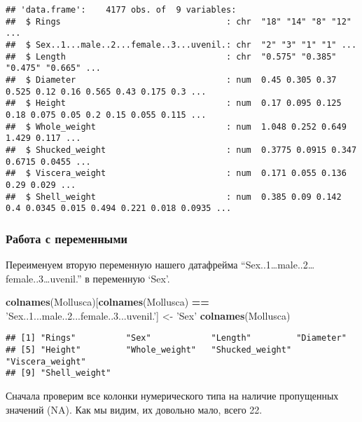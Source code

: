 \documentclass[]{article}
\newenvironment{Shaded}{\begin{snugshade}}{\end{snugshade}}
\newcommand{\KeywordTok}[1]{\textcolor[rgb]{0.13,0.29,0.53}{\textbf{#1}}}
\newcommand{\NormalTok}[1]{#1}
\newcommand{\OperatorTok}[1]{\textcolor[rgb]{0.81,0.36,0.00}{\textbf{#1}}}
\newcommand{\StringTok}[1]{\textcolor[rgb]{0.31,0.60,0.02}{#1}}
\begin{document}
\begin{verbatim}
## 'data.frame':    4177 obs. of  9 variables:
##  $ Rings                                 : chr  "18" "14" "8" "12" ...
##  $ Sex..1...male..2...female..3...uvenil.: chr  "2" "3" "1" "1" ...
##  $ Length                                : chr  "0.575" "0.385" "0.475" "0.665" ...
##  $ Diameter                              : num  0.45 0.305 0.37 0.525 0.12 0.16 0.565 0.43 0.175 0.3 ...
##  $ Height                                : num  0.17 0.095 0.125 0.18 0.075 0.05 0.2 0.15 0.055 0.115 ...
##  $ Whole_weight                          : num  1.048 0.252 0.649 1.429 0.117 ...
##  $ Shucked_weight                        : num  0.3775 0.0915 0.347 0.6715 0.0455 ...
##  $ Viscera_weight                        : num  0.171 0.055 0.136 0.29 0.029 ...
##  $ Shell_weight                          : num  0.385 0.09 0.142 0.4 0.0345 0.015 0.494 0.221 0.018 0.0935 ...
\end{verbatim}

\hypertarget{ux440ux430ux431ux43eux442ux430-ux441-ux43fux435ux440ux435ux43cux435ux43dux43dux44bux43cux438}{%
\subsubsection{Работа с
переменными}\label{ux440ux430ux431ux43eux442ux430-ux441-ux43fux435ux440ux435ux43cux435ux43dux43dux44bux43cux438}}

Переименуем вторую переменную нашего датафрейма
``Sex..1\ldots{}male..2\ldots{}female..3\ldots{}uvenil.'' в переменную
`Sex'.

\begin{Shaded}
\begin{Highlighting}[]
\KeywordTok{colnames}\NormalTok{(Mollusca)[}\KeywordTok{colnames}\NormalTok{(Mollusca) }\OperatorTok{==}\StringTok{ 'Sex..1...male..2...female..3...uvenil.'}\NormalTok{] <-}\StringTok{ 'Sex'}
\KeywordTok{colnames}\NormalTok{(Mollusca)}
\end{Highlighting}
\end{Shaded}

\begin{verbatim}
## [1] "Rings"          "Sex"            "Length"         "Diameter"      
## [5] "Height"         "Whole_weight"   "Shucked_weight" "Viscera_weight"
## [9] "Shell_weight"
\end{verbatim}

Сначала проверим все колонки нумерического типа на наличие пропущенных
значений (NA). Как мы видим, их довольно мало, всего 22.
\end{document}
